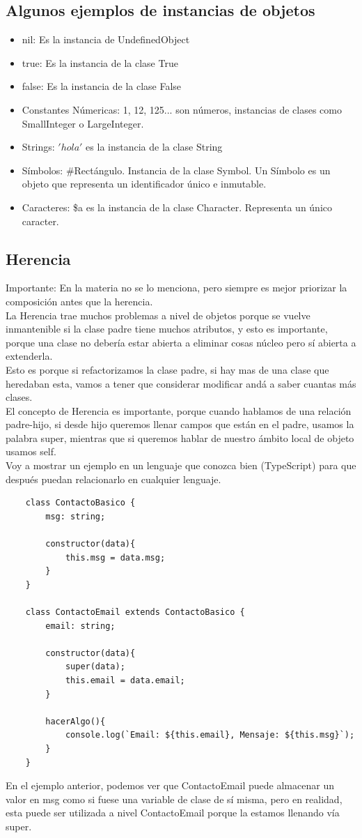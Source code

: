 \documentclass[10pt,a4paper]{article}
\begin{document}
\subsection*{Algunos ejemplos de instancias de objetos}
\begin{itemize}
    \item nil: Es la instancia de UndefinedObject
    \item true: Es la instancia de la clase True 
    \item false: Es la instancia de la clase False
    \item Constantes Númericas: 1, 12, 125... son números, instancias de clases como SmallInteger o LargeInteger.
    \item Strings: $'hola'$ es la instancia de la clase String
    \item Símbolos: \#Rectángulo. Instancia de la clase Symbol. Un Símbolo es un objeto que representa un identificador único e inmutable. 
    \item Caracteres: \$a es la instancia de la clase Character. Representa un único caracter.
\end{itemize}
\subsection*{Herencia}
Importante: En la materia no se lo menciona, pero siempre es mejor priorizar la composición antes que la herencia. \\
La Herencia trae muchos problemas a nivel de objetos porque se vuelve inmantenible si la clase padre tiene muchos atributos, y esto es importante, porque una clase no debería estar abierta a eliminar cosas núcleo pero sí abierta a extenderla. \\
Esto es porque si refactorizamos la clase padre, si hay mas de una clase que heredaban esta, vamos a tener que considerar modificar andá a saber cuantas más clases. \\
El concepto de Herencia es importante, porque cuando hablamos de una relación padre-hijo, si desde hijo queremos llenar campos que están en el padre, usamos la palabra super, mientras que si queremos hablar de nuestro ámbito local de objeto usamos self. \\
Voy a mostrar un ejemplo en un lenguaje que conozca bien (TypeScript) para que después puedan relacionarlo en cualquier lenguaje. 
\begin{lstlisting}
    class ContactoBasico {
        msg: string;

        constructor(data){
            this.msg = data.msg;
        }
    }

    class ContactoEmail extends ContactoBasico {
        email: string;

        constructor(data){
            super(data);
            this.email = data.email;
        }

        hacerAlgo(){
            console.log(`Email: ${this.email}, Mensaje: ${this.msg}`);
        }
    }
\end{lstlisting}
En el ejemplo anterior, podemos ver que ContactoEmail puede almacenar un valor en msg como si fuese una variable de clase de sí misma, pero en realidad, esta puede ser utilizada a nivel ContactoEmail porque la estamos llenando vía super.
\end{document}
